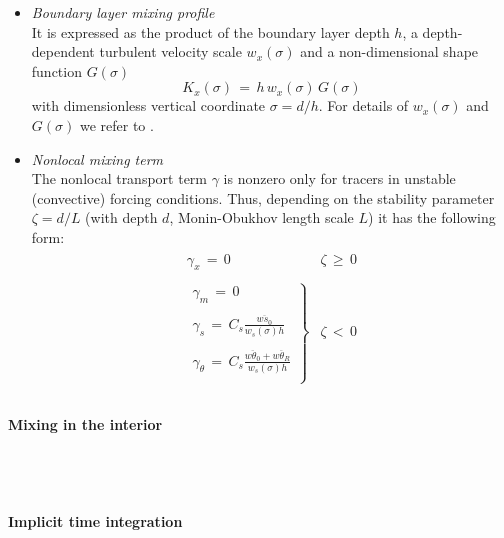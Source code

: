 \begin{itemize}
%
\item
\textit{Boundary layer mixing profile} \\
%
It is expressed as the product of the boundary layer depth $h$,
a depth-dependent turbulent velocity scale $w_x(\sigma)$ and a
non-dimensional shape function $G(\sigma)$
%
\begin{equation}
K_x(\sigma) \, = \, h \, w_x(\sigma) \, G(\sigma)
\end{equation}
%
with dimensionless vertical coordinate $\sigma = d/h$.
For details of $ w_x(\sigma)$ and $G(\sigma)$ we refer to
\cite{lar-eta:94}.

%
\item
\textit{Nonlocal mixing term} \\
%
The nonlocal transport term $\gamma$ is nonzero only for
tracers in unstable (convective) forcing conditions.
Thus, depending on the  stability parameter $\zeta = d/L$ 
(with depth $d$, Monin-Obukhov length scale $L$)
it has the following form:
%
\begin{eqnarray}
\begin{array}{cl}
\gamma_x \, = \, 0 & \zeta \, \ge \, 0 \\
~ & ~ \\
\left.
\begin{array}{c}
\gamma_m \, = \, 0 \\
 ~ \\
\gamma_s \, = \, C_s 
\frac{\overline{w s_0}}{w_s(\sigma) h} \\
 ~ \\
\gamma_{\theta} \, = \, C_s
\frac{\overline{w \theta_0}+\overline{w \theta_R}}{w_s(\sigma) h} \\
\end{array}
\right\} 
&
\zeta \, < \, 0 \\
\end{array}
\end{eqnarray}

\end{itemize}


\paragraph{Mixing in the interior} ~ \\
%
~

\paragraph{Implicit time integration} ~ \\
%
~

